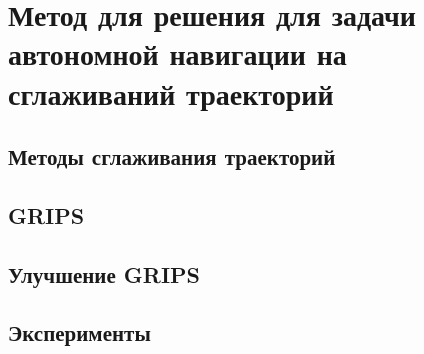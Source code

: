 \chapter{Метод для решения для задачи автономной навигации на сглаживаний траекторий}\label{ch:ch2}

\section{Методы сглаживания траекторий}\label{sec:ch2/sec1}

\section{GRIPS}\label{sec:ch2/sec2}

\section{Улучшение GRIPS}\label{sec:ch2/sec3}

\section{Эксперименты}\label{sec:ch2/sec3}